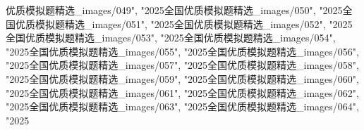 优质模拟题精选_images/049", "2025全国优质模拟题精选_images/050", "2025全国优质模拟题精选_images/051", "2025全国优质模拟题精选_images/052", "2025全国优质模拟题精选_images/053", "2025全国优质模拟题精选_images/054", "2025全国优质模拟题精选_images/055", "2025全国优质模拟题精选_images/056", "2025全国优质模拟题精选_images/057", "2025全国优质模拟题精选_images/058", "2025全国优质模拟题精选_images/059", "2025全国优质模拟题精选_images/060", "2025全国优质模拟题精选_images/061", "2025全国优质模拟题精选_images/062", "2025全国优质模拟题精选_images/063", "2025全国优质模拟题精选_images/064", "2025